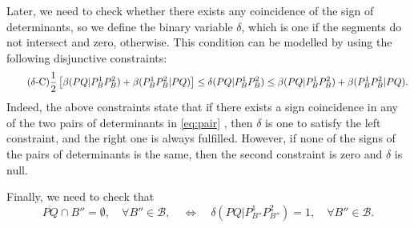 \documentclass[a4paper,  review, authoryear, 1p.]{elsarticle}
\newcommand{\B}{{\mathcal B}}
\newcommand{\ES}{{E^{}_{S}}}
\newcommand{\segment}[2]{\overline{#1#2}}
\newcommand{\determinant}[3]{\det({#1|#2#3})}
\begin{document}
	\bigskip
	
	\newcommand{\deltacheck}[4]{\delta(#1#2|#3#4)}
	
	Later, we need to check whether there exists any coincidence of the sign of determinants, so we define the binary variable $\delta$, which is one if the segments do not intersect and zero, otherwise. This condition can be modelled by using the following disjunctive constraints:
	\begin{equation*}\tag{$\delta$-C}\label{eq:deltaC}
		\frac{1}{2}\left[\betamas{P}{Q}{P_B^1}{P_B^2}+\betamas{P_B^1}{P_B^2}{P}{Q}\right]\leq\deltacheck{P}{Q}{P_B^1}{P_B^2}\leq \betamas{P}{Q}{P_B^1}{P_B^2}+\betamas{P_B^1}{P_B^2}{P}{Q}.
	\end{equation*}
	Indeed, the above constraints state that if there exists a sign coincidence in any of the two pairs of determinants in \eqref{eq:pair} , then $\delta$ is one to satisfy the left constraint, and the right one is always fulfilled. However, if none of the signs of the pairs of determinants is the same, then the second constraint is zero and $\delta$ is null.
	
	Finally, we need to check that
	$$\overline{PQ}\cap B''=\emptyset,\quad \forall B''\in\B,\quad\Longleftrightarrow\quad \deltacheck{P}{Q}{P_{B''}^1}{P_{B''}^2}=1,\quad\forall B''\in\B.$$
	
	
	\newcommand{\varepsilonvar}[2]{\varepsilon(#1#2)}
	
\end{document}
